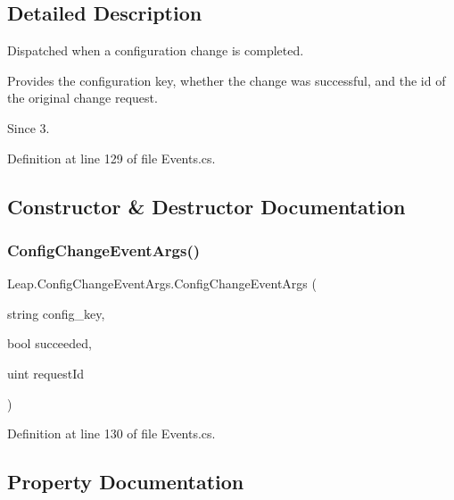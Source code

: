 \subsection{Detailed Description}
Dispatched when a configuration change is completed. 

Provides the configuration key, whether the change was successful, and the id of the original change request. \begin{DoxySince}{Since}
3. 
\end{DoxySince}


Definition at line 129 of file Events.\+cs.



\subsection{Constructor \& Destructor Documentation}
\mbox{\label{class_leap_1_1_config_change_event_args_a209ff2d590318831b86f6b9276ed84a8}} 
\subsubsection{\texorpdfstring{ConfigChangeEventArgs()}{ConfigChangeEventArgs()}}
{\footnotesize\ttfamily Leap.\+Config\+Change\+Event\+Args.\+Config\+Change\+Event\+Args (\begin{DoxyParamCaption}\item[{string}]{config\+\_\+key,  }\item[{bool}]{succeeded,  }\item[{uint}]{request\+Id }\end{DoxyParamCaption})}



Definition at line 130 of file Events.\+cs.



\subsection{Property Documentation}
\mbox{\label{class_leap_1_1_config_change_event_args_a9191ad7b7088320c72c544377f1f9cb8}} 
